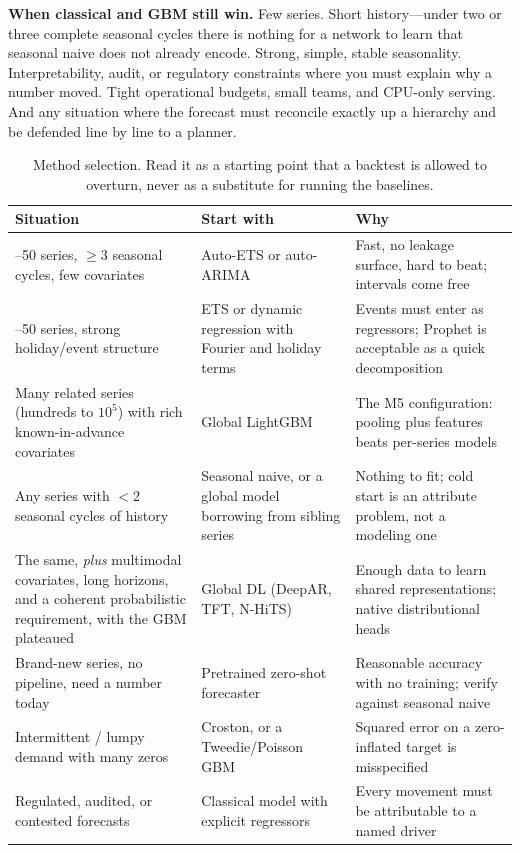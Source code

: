 \textbf{When classical and GBM still win.} Few series. Short history---under two or three complete seasonal cycles there is nothing for a network to learn that seasonal naive does not already encode. Strong, simple, stable seasonality. Interpretability, audit, or regulatory constraints where you must explain why a number moved. Tight operational budgets, small teams, and CPU-only serving. And any situation where the forecast must reconcile exactly up a hierarchy and be defended line by line to a planner.

\begin{table}[H]\centering
\caption{Method selection. Read it as a starting point that a backtest is allowed to overturn, never as a substitute for running the baselines.}
\label{cml:tab:ts_method_choice}
\begin{tabularx}{\textwidth}{@{}>{\raggedright\arraybackslash}p{} >{\raggedright\arraybackslash}p{} X@{}}
\toprule
\textbf{Situation} & \textbf{Start with} & \textbf{Why} \\
\midrule
1--50 series, $\ge 3$ seasonal cycles, few covariates & Auto-ETS or auto-ARIMA & Fast, no leakage surface, hard to beat; intervals come free \\
1--50 series, strong holiday/event structure & ETS or dynamic regression with Fourier and holiday terms & Events must enter as regressors; Prophet is acceptable as a quick decomposition \\
Many related series (hundreds to $10^5$) with rich known-in-advance covariates & Global LightGBM & The M5 configuration: pooling plus features beats per-series models \\
Any series with $< 2$ seasonal cycles of history & Seasonal naive, or a global model borrowing from sibling series & Nothing to fit; cold start is an attribute problem, not a modeling one \\
The same, \emph{plus} multimodal covariates, long horizons, and a coherent probabilistic requirement, with the GBM plateaued & Global DL (DeepAR, TFT, N-HiTS) & Enough data to learn shared representations; native distributional heads \\
Brand-new series, no pipeline, need a number today & Pretrained zero-shot forecaster & Reasonable accuracy with no training; verify against seasonal naive \\
Intermittent / lumpy demand with many zeros & Croston, or a Tweedie/Poisson GBM & Squared error on a zero-inflated target is misspecified \\
Regulated, audited, or contested forecasts & Classical model with explicit regressors & Every movement must be attributable to a named driver \\
\bottomrule
\end{tabularx}
\end{table}

